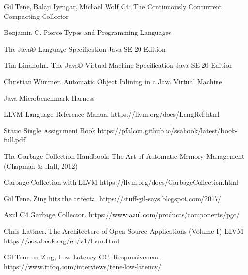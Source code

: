 \begingroup 
\renewcommand{\section}[2]{\anonsection{Библиографический список}}
\begin{flushleft}
\begin{thebibliography}{}

Gil Tene, Balaji Iyengar, Michael Wolf C4: The Continuously Concurrent Compacting Collector

Benjamin C. Pierce Types and Programming Languages

The Java® Language Specification Java SE 20 Edition 

Tim Lindholm. The Java® Virtual Machine Specification Java SE 20 Edition
	
Christian Wimmer. Automatic Object Inlining in a Java Virtual Machine

Java Microbenchmark Harness 
	
	LLVM Language Reference Manual https://llvm.org/docs/LangRef.html
	
Static Single Assignment Book https://pfalcon.github.io/ssabook/latest/book-full.pdf
	
The Garbage Collection Handbook: The Art of Automatic Memory Management (Chapman \& Hall, 2012)
	
Garbage Collection with LLVM https://llvm.org/docs/GarbageCollection.html
	
Gil Tene. Zing hits the trifecta. https://stuff-gil-says.blogspot.com/2017/

Azul C4 Garbage Collector. https://www.azul.com/products/components/pgc/

Chris Lattner. The Architecture of Open Source Applications (Volume 1) LLVM https://aosabook.org/en/v1/llvm.html

Gil Tene on Zing, Low Latency GC, Responsiveness. https://www.infoq.com/interviews/tene-low-latency/
\end{thebibliography}
\end{flushleft}
\endgroup

\clearpage
